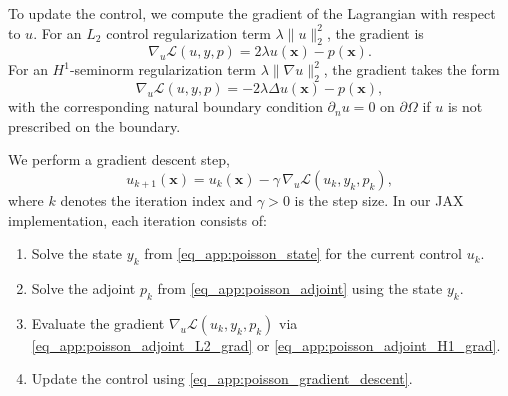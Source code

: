\documentclass[final,1p,times]{elsarticle}
\theoremstyle{plain} %
\theoremstyle{definition} %
\theoremstyle{remark} %
\begin{document}
To update the control, we compute the gradient of the Lagrangian with respect to $u$.
For an $L_2$ control regularization term $\lambda\|u\|_{2}^2$, the gradient is
\begin{equation}\label{eq_app:poisson_adjoint_L2_grad}
\nabla_u \mathcal{L}(u,y,p)=2\lambda u(\mathbf{x}) - p(\mathbf{x}).
\end{equation}
For an $H^1$-seminorm regularization term $\lambda\|\nabla u\|_{2}^2$, the gradient takes the form
\begin{equation}\label{eq_app:poisson_adjoint_H1_grad}
\nabla_u \mathcal{L}(u,y,p)= -2\lambda \Delta u(\mathbf{x}) - p(\mathbf{x}),
\end{equation}
with the corresponding natural boundary condition $\partial_n u=0$ on $\partial\Omega$ if $u$ is not prescribed on the boundary.

We perform a gradient descent step,
\begin{equation}\label{eq_app:poisson_gradient_descent}
u_{k+1}(\mathbf{x}) = u_k(\mathbf{x}) - \gamma\,\nabla_u \mathcal{L}(u_k,y_k,p_k),
\end{equation}
where $k$ denotes the iteration index and $\gamma>0$ is the step size. In our JAX implementation, each iteration consists of:
\begin{enumerate}
    \item Solve the state $y_k$ from \eqref{eq_app:poisson_state} for the current control $u_k$.
    \item Solve the adjoint $p_k$ from \eqref{eq_app:poisson_adjoint} using the state $y_k$.
    \item Evaluate the gradient $\nabla_u \mathcal{L}(u_k,y_k,p_k)$ via \eqref{eq_app:poisson_adjoint_L2_grad} or \eqref{eq_app:poisson_adjoint_H1_grad}.
    \item Update the control using \eqref{eq_app:poisson_gradient_descent}.
\end{enumerate}
\end{document}
